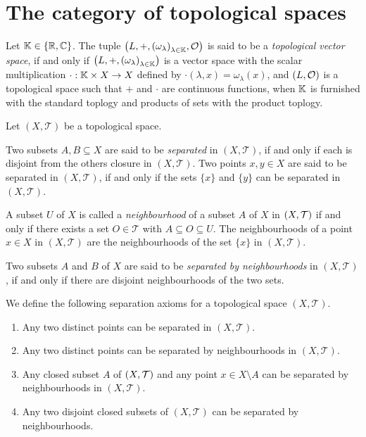 \section{The category of topological spaces}


\begin{definition}
	Let $\mathbb K \in {\left \{ \mathbb R, \mathbb C\right \}}$. The tuple $\tvspace{\K}$ is said to be a \textit{topological vector space}, if and only if ${\left ( L, +, {\left ( \omega_\lambda \right )}_{\lambda \in \mathbb K} \right )}$ is a vector space with the scalar multiplication $\cdot: \mathbb K \times X \to X$ defined by $\cdot(\lambda, x) = \omega_\lambda(x)$, and $\tspace[L][O]$ is a topological space such that $+$ and $\cdot$ are continuous functions, when $\mathbb K$ is furnished with the standard toplogy and products of sets with the product toplogy.
\end{definition}

\begin{definition}
	Let $(X, \mathcal{T})$ be a topological space. 
	
	Two subsets $A,B \subseteq X$ are said to be \textit{separated} in $(X, \mathcal{T})$, if and only if each is disjoint from the others closure in $(X, \mathcal{T})$. Two points $x,y \in X$ are said to be separated in $(X, \mathcal{T})$, if and only if the sets $\{x\}$ and $\{y\}$ can be separated in $(X, \mathcal{T})$.
	
	A subset $U$ of $X$ is called a \textit{neighbourhood} of a subset $A$ of $X$ in $\tspace$ if and only if there exists a set $O \in \mathcal{T}$ with $A \subseteq O \subseteq U$. The neighbourhoods of a point $x \in X$ in $(X, \mathcal{T})$ are the neighbourhoods of the set $\{x\}$ in $(X, \mathcal{T})$.
	
	Two subsets $A$ and $B$ of $X$ are said to be \textit{separated by neighbourhoods} in $(X, \mathcal{T})$, if and only if there are disjoint neighbourhoods of the two sets. 
\end{definition}

\begin{definition}
	We define the following separation axioms for a topological space $(X, \mathcal{T})$.
	\begin{enumerate}[label= $(T_\arabic*)$]
		\item \label{axiom:t1} Any two distinct points can be separated in $(X, \mathcal{T})$. 
		
		\item \label{axiom:t2} Any two distinct points can be separated by neighbourhoods in $(X, \mathcal{T})$. 
		
		\item \label{axiom:t3} Any closed subset $A$ of $\tspace$ and any point $x \in X\setminus A$ can be separated by neighbourhoods in $(X, \mathcal{T})$. 
		
		\item \label{axiom:t4} Any two disjoint closed subsets of $(X, \mathcal{T})$ can be separated by neighbourhoods. 
	\end{enumerate}
\end{definition}

